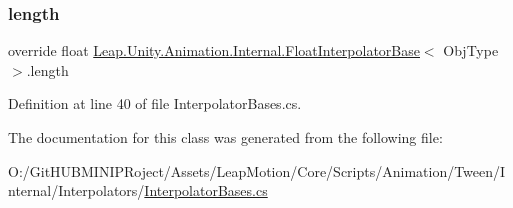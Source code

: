 \subsubsection{\texorpdfstring{length}{length}}
{\footnotesize\ttfamily override float \mbox{\hyperlink{class_leap_1_1_unity_1_1_animation_1_1_internal_1_1_float_interpolator_base}{Leap.\+Unity.\+Animation.\+Internal.\+Float\+Interpolator\+Base}}$<$ Obj\+Type $>$.length\hspace{0.3cm}{\ttfamily [get]}}



Definition at line 40 of file Interpolator\+Bases.\+cs.



The documentation for this class was generated from the following file\+:\begin{DoxyCompactItemize}
\item 
O\+:/\+Git\+H\+U\+B\+M\+I\+N\+I\+P\+Roject/\+Assets/\+Leap\+Motion/\+Core/\+Scripts/\+Animation/\+Tween/\+Internal/\+Interpolators/\mbox{\hyperlink{_interpolator_bases_8cs}{Interpolator\+Bases.\+cs}}\end{DoxyCompactItemize}
